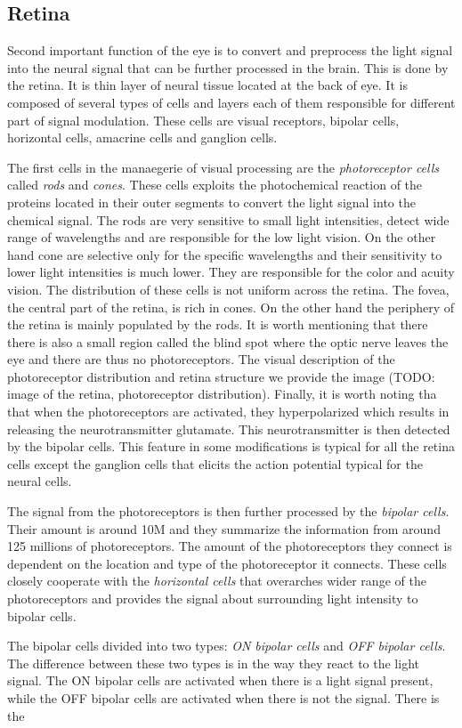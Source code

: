 \subsection{Retina}
\label{subsec:retina}
Second important function of the eye is to convert and preprocess the 
light signal into the neural signal that can be further processed in the brain.
This is done by the retina. It is thin layer of neural tissue located at the back
of eye. It is composed of several types of cells and layers each of them responsible
for different part of signal modulation. These cells are visual receptors,
bipolar cells, horizontal cells, amacrine cells and ganglion cells.

The first cells in the manaegerie of visual processing are the \emph{photoreceptor cells}
called \emph{rods} and \emph{cones}. These cells exploits the photochemical reaction of the 
proteins located in their outer segments to convert the light signal into the
chemical signal. The rods are very sensitive to small light intensities, 
detect wide range of wavelengths and are responsible for the low light vision.
On the other hand cone are selective only for the specific wavelengths and their
sensitivity to lower light intensities is much lower. They are responsible for the
color and acuity vision. The distribution of these cells is not uniform across
the retina. The fovea, the central part of the retina, is rich in cones. On the other
hand the periphery of the retina is mainly populated by the rods. It is worth
mentioning that there there is also a small region called the blind spot where
the optic nerve leaves the eye and there are thus no photoreceptors. The 
visual description of the photoreceptor distribution and retina structure we
provide the image (TODO: image of the retina, photoreceptor distribution). Finally,
it is worth noting tha that when the photoreceptors are activated, they hyperpolarized
which results in releasing the neurotransmitter glutamate. This neurotransmitter
is then detected by the bipolar cells. This feature in some modifications is 
typical for all the retina cells except the ganglion cells that elicits the 
action potential typical for the neural cells.

The signal from the photoreceptors is then further processed by the 
\emph{bipolar cells}. Their amount is around 10M and they summarize the 
information from around 125 millions of photoreceptors. The amount of the 
photoreceptors they connect is dependent on the location and type of the 
photoreceptor it connects. These cells closely cooperate with the 
\emph{horizontal cells} that overarches wider range of the photoreceptors
and provides the signal about surrounding light intensity to bipolar cells.

The bipolar cells divided into two types: \emph{ON bipolar cells} and 
\emph{OFF bipolar cells}. The difference between these two types is in the 
way they react to the light signal. The ON bipolar cells are activated when there
is a light signal present, while the OFF bipolar cells are activated when there is not
the signal. There is the 
